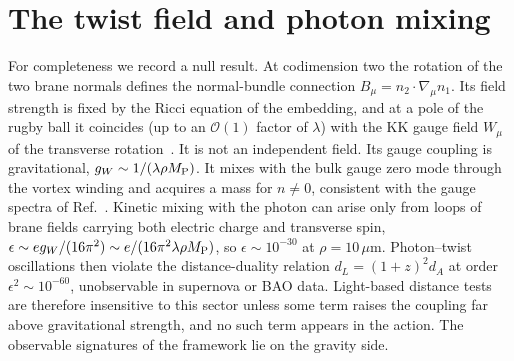 \documentclass[aps,prd,reprint,superscriptaddress,nofootinbib,floatfix]{revtex4-2}
\theoremstyle{definition}
\newcommand{\MP}{M_{\rm P}}
\newcommand{\um}{\,\mu\mathrm{m}}
\begin{document}
\section{The twist field and photon mixing}\label{app:twist}

For completeness we record a null result. At codimension two the rotation of the two brane normals defines the normal-bundle connection $B_\mu=n_2\cdot\nabla_\mu n_1$. Its field strength is fixed by the Ricci equation of the embedding, and at a pole of the rugby ball it coincides (up to an $\mathcal{O}(1)$ factor of $\lambda$) with the KK gauge field $W_\mu$ of the transverse rotation~\cite{Neronov2001}. It is not an independent field. Its gauge coupling is gravitational, $g_W\sim1/(\lambda\rho\MP)$. It mixes with the bulk gauge zero mode through the vortex winding and acquires a mass for $n\neq0$, consistent with the gauge spectra of Ref.~\cite{PRS2007}. Kinetic mixing with the photon can arise only from loops of brane fields carrying both electric charge and transverse spin, $\epsilon\sim e g_W/(16\pi^2)\sim e/(16\pi^2\lambda\rho\MP)$, so $\epsilon\sim10^{-30}$ at $\rho=10\um$. Photon--twist oscillations then violate the distance-duality relation $d_L=(1+z)^2d_A$ at order $\epsilon^2\sim10^{-60}$, unobservable in supernova or BAO data. Light-based distance tests are therefore insensitive to this sector unless some term raises the coupling far above gravitational strength, and no such term appears in the action. The observable signatures of the framework lie on the gravity side.
\end{document}
